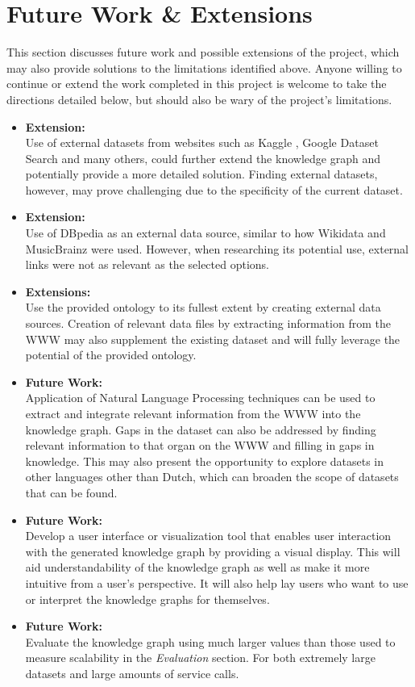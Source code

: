 \section{Future Work \& Extensions}
This section discusses future work and possible extensions of the project, which may also provide solutions to the limitations identified above. Anyone willing to continue or extend the work completed in this project is welcome to take the directions detailed below, but should also be wary of the project's limitations. 

\begin{itemize}
    \item \textbf{Extension:} \\ Use of external datasets from websites such as Kaggle \cite{kaggle}, Google Dataset Search \cite{googledatasetsearch} and many others, could further extend the knowledge graph and potentially provide a more detailed solution. Finding external datasets, however, may prove challenging due to the specificity of the current dataset. 
    \item \textbf{Extension:} \\ Use of DBpedia \cite{organdbpedia} as an external data source, similar to how Wikidata and MusicBrainz were used. However, when researching its potential use, external links were not as relevant as the selected options. 
    \item \textbf{Extensions:} \\ Use the provided ontology to its fullest extent by creating external data sources. Creation of relevant data files by extracting information from the WWW may also supplement the existing dataset and will fully leverage the potential of the provided ontology. 
    \item \textbf{Future Work:} \\ Application of Natural Language Processing techniques can be used to extract and integrate relevant information from the WWW into the knowledge graph. Gaps in the dataset can also be addressed by finding relevant information to that organ on the WWW and filling in gaps in knowledge. This may also present the opportunity to explore datasets in other languages other than Dutch, which can broaden the scope of datasets that can be found. 
    \item \textbf{Future Work:} \\ Develop a user interface or visualization tool that enables user interaction with the generated knowledge graph by providing a visual display. This will aid understandability of the knowledge graph as well as make it more intuitive from a user's perspective. It will also help lay users who want to use or interpret the knowledge graphs for themselves. 
    \item \textbf{Future Work:} \\ Evaluate the knowledge graph using much larger values than those used to measure scalability in the \textit{Evaluation} section. For both extremely large datasets and large amounts of service calls. 
\end{itemize}

